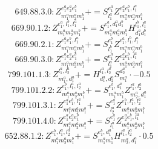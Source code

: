 \documentclass[letterpaper,10pt,fleqn,leqno,onecolumn]{article}
\begin{document}
\begin{equation} \;\;\;\;\;\;  649.88.3.0: Z^{e_{1}^{a}e_{2}^{a}e_{1}^{b}}_{m_{1}^{a}m_{2}^{a}m_{1}^{b}}+=S^{e_{1}^{a}}_{l_{1}^{a}}Z^{e_{2}^{a}e_{1}^{b},l_{1}^{a}}_{m_{1}^{a}m_{2}^{a}m_{1}^{b}} \end{equation}
\begin{equation} \;\;\;\;\;\;  669.90.1.2: Z^{e_{1}^{a},l_{1}^{b},l_{1}^{a}}_{m_{1}^{a}m_{2}^{a}m_{1}^{b}}+=S^{e_{1}^{a},d_{1}^{a}d_{1}^{b}}_{m_{1}^{a}m_{2}^{a}m_{1}^{b}}H^{l_{1}^{b},l_{1}^{a}}_{d_{1}^{a}d_{1}^{b}} \end{equation}
\begin{equation} \;\;\;\;\;\;  669.90.2.1: Z^{e_{1}^{a}e_{1}^{b},l_{1}^{a}}_{m_{1}^{a}m_{2}^{a}m_{1}^{b}}+=S^{e_{1}^{b}}_{l_{1}^{b}}Z^{e_{1}^{a},l_{1}^{b},l_{1}^{a}}_{m_{1}^{a}m_{2}^{a}m_{1}^{b}} \end{equation}
\begin{equation} \;\;\;\;\;\;  669.90.3.0: Z^{e_{1}^{a}e_{2}^{a}e_{1}^{b}}_{m_{1}^{a}m_{2}^{a}m_{1}^{b}}+=S^{e_{1}^{a}}_{l_{1}^{a}}Z^{e_{2}^{a}e_{1}^{b},l_{1}^{a}}_{m_{1}^{a}m_{2}^{a}m_{1}^{b}} \end{equation}
\begin{equation} \;\;\;\;\;\;  799.101.1.3: Z^{l_{1}^{a},l_{2}^{a}}_{m_{1}^{a},d_{1}^{a}}+=H^{l_{1}^{a},l_{2}^{a}}_{d_{1}^{a},d_{2}^{a}}S^{d_{2}^{a}}_{m_{1}^{a}}\cdot -0.5 \end{equation}
\begin{equation} \;\;\;\;\;\;  799.101.2.2: Z^{e_{1}^{b},l_{1}^{a},l_{2}^{a}}_{m_{1}^{a}m_{2}^{a}m_{1}^{b}}+=S^{e_{1}^{b},d_{1}^{a}}_{m_{1}^{a}m_{1}^{b}}Z^{l_{1}^{a},l_{2}^{a}}_{m_{2}^{a},d_{1}^{a}} \end{equation}
\begin{equation} \;\;\;\;\;\;  799.101.3.1: Z^{e_{1}^{a}e_{1}^{b},l_{1}^{a}}_{m_{1}^{a}m_{2}^{a}m_{1}^{b}}+=S^{e_{1}^{a}}_{l_{2}^{a}}Z^{e_{1}^{b},l_{1}^{a},l_{2}^{a}}_{m_{1}^{a}m_{2}^{a}m_{1}^{b}} \end{equation}
\begin{equation} \;\;\;\;\;\;  799.101.4.0: Z^{e_{1}^{a}e_{2}^{a}e_{1}^{b}}_{m_{1}^{a}m_{2}^{a}m_{1}^{b}}+=S^{e_{1}^{a}}_{l_{1}^{a}}Z^{e_{2}^{a}e_{1}^{b},l_{1}^{a}}_{m_{1}^{a}m_{2}^{a}m_{1}^{b}} \end{equation}
\begin{equation} \;\;\;\;\;\;  652.88.1.2: Z^{e_{1}^{b},l_{1}^{a},l_{2}^{a}}_{m_{1}^{a}m_{2}^{a}m_{1}^{b}}+=S^{e_{1}^{b},d_{1}^{a}}_{m_{1}^{a}m_{1}^{b}}H^{l_{1}^{a},l_{2}^{a}}_{m_{2}^{a},d_{1}^{a}}\cdot 0.5 \end{equation}
\end{document}
